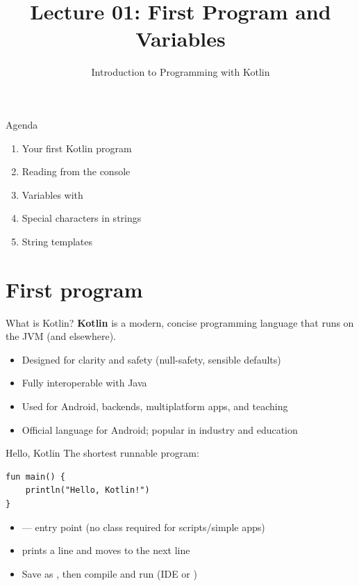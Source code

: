 \documentclass[aspectratio=169,11pt]{beamer}
\title{Lecture 01: First Program and Variables}
\subtitle{Introduction to Programming with Kotlin}
\begin{document}
    \begin{frame}
        \titlepage
    \end{frame}

    \begin{frame}{Agenda}
        \begin{enumerate}
            \item Your first Kotlin program
            \item Reading from the console
            \item Variables with 
            \item Special characters in strings
            \item String templates
        \end{enumerate}
    \end{frame}

    \section{First program}

    \begin{frame}{What is Kotlin?}
        \textbf{Kotlin} is a modern, concise programming language that runs on the JVM
        (and elsewhere).
        \vspace{0.8em}
        \begin{itemize}
            \item Designed for clarity and safety (null-safety, sensible defaults)
            \item Fully interoperable with Java
            \item Used for Android, backends, multiplatform apps, and teaching
            \item Official language for Android; popular in industry and education
        \end{itemize}
    \end{frame}

    \begin{frame}[fragile]{Hello, Kotlin}
        The shortest runnable program:
        \vspace{0.4em}
        \begin{lstlisting}
fun main() {
    println("Hello, Kotlin!")
}
        \end{lstlisting}
        \vspace{0.4em}
        \begin{itemize}
            \item {} --- entry point (no class required for scripts/simple apps)
            \item {} prints a line and moves to the next line
            \item Save as , then compile and run (IDE or )
        \end{itemize}
    \end{frame}
\end{document}
